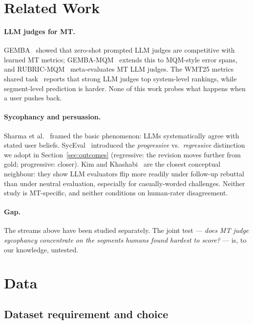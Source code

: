\documentclass[11pt]{article}
\begin{document}
\section{Related Work}

\paragraph{LLM judges for MT.}
GEMBA~\cite{kocmi-federmann-2023-gemba} showed that zero-shot prompted LLM
judges are competitive with learned MT metrics;
GEMBA-MQM~\cite{kocmi-federmann-2023-gemba-mqm} extends this to MQM-style
error spans, and RUBRIC-MQM~\cite{kim-rubric-mqm-2025} meta-evaluates MT
LLM judges. The WMT25 metrics shared task~\cite{wmt2025metrics} reports
that strong LLM judges top system-level rankings, while segment-level
prediction is harder. None of this work probes what happens when a user
pushes back.

\paragraph{Sycophancy and persuasion.}
Sharma et al.~\cite{sharma-sycophancy-2023} framed the basic phenomenon:
LLMs systematically agree with stated user beliefs.
SycEval~\cite{syceval-2025} introduced the \emph{progressive} vs.\
\emph{regressive} distinction we adopt in Section~\ref{sec:outcomes}
(regressive: the revision moves further from gold; progressive: closer).
Kim and Khashabi~\cite{kim-khashabi-2025} are the closest conceptual
neighbour: they show LLM evaluators flip more readily under follow-up
rebuttal than under neutral evaluation, especially for casually-worded
challenges. Neither study is MT-specific, and neither conditions on
human-rater disagreement.

\paragraph{Gap.}
The streams above have been studied separately. The joint test ---
\emph{does MT judge sycophancy concentrate on the segments humans found
hardest to score?} --- is, to our knowledge, untested.

\section{Data}

\subsection{Dataset requirement and choice}
\label{sec:dataset}
\end{document}
